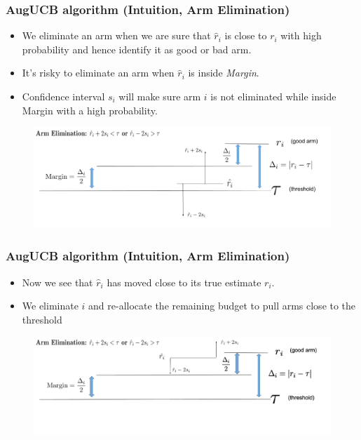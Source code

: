 \begin{frame}
\frametitle{AugUCB algorithm (Intuition, Arm Elimination)}
\begin{itemize}
\item We eliminate an arm when we are sure that $\hat{r}_i$ is close to $r_i$ with high probability and hence identify it as good or bad arm.
\item It's risky to eliminate an arm when $\hat{r}_i$ is inside \emph{Margin}. 
\item Confidence interval $s_i$ will make sure arm $i$ is not eliminated while inside Margin with a high probability.  
\end{itemize}

\begin{figure}
\includegraphics[scale=0.278]{img/ArmElim1.png}
\end{figure}
\end{frame}

\begin{frame}
\frametitle{AugUCB algorithm (Intuition, Arm Elimination)}

\begin{itemize}
\item Now we see that $\hat{r}_i$ has moved close to its true estimate $r_i$.
\item We eliminate $i$ and re-allocate the remaining budget to pull arms close to the threshold
\end{itemize}


\begin{figure}
\includegraphics[scale=0.278]{img/ArmElim2.png}
\end{figure}
\end{frame}

